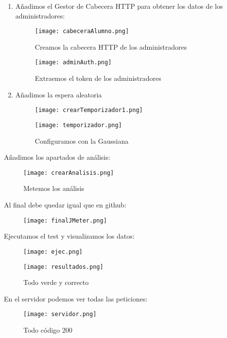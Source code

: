 \begin{enumerate}
	\item Añadimos el Gestor de Cabecera HTTP para obtener los datos de los administradores:
	\begin{figure}[H]
		\centering
		\texttt{[image: cabeceraAlumno.png]}
		\caption{Creamos la cabecera HTTP de los administradores}
	\end{figure}
	\begin{figure}[H]
		\centering
		\texttt{[image: adminAuth.png]}
		\caption{Extraemos el token de los administradores}
	\end{figure}

	\item Añadimos la espera aleatoria
	\begin{figure}[H]
		\centering
		\texttt{[image: crearTemporizador1.png]}
	\end{figure}
	\begin{figure}[H]
		\centering
		\texttt{[image: temporizador.png]}
		\caption{Configuramos con la Gaussiana}
	\end{figure}
\end{enumerate}

Añadimos los apartados de análisis:
\begin{figure}[H]
	\centering
	\texttt{[image: crearAnalisis.png]}
	\caption{Metemos los análisis}
\end{figure}

Al final debe quedar igual que en github:
\begin{figure}[H]
	\centering
	\texttt{[image: finalJMeter.png]}
\end{figure}
Ejecutamos el test y visualizamos los datos:
\begin{figure}[H]
	\centering
	\texttt{[image: ejec.png]}
\end{figure}
\begin{figure}[H]
	\centering
	\texttt{[image: resultados.png]}
	\caption{Todo verde y correcto}
\end{figure}

\newpage

En el servidor podemos ver todas las peticiones:
\begin{figure}[H]
	\centering
	\texttt{[image: servidor.png]}
	\caption{Todo código 200}
\end{figure}

